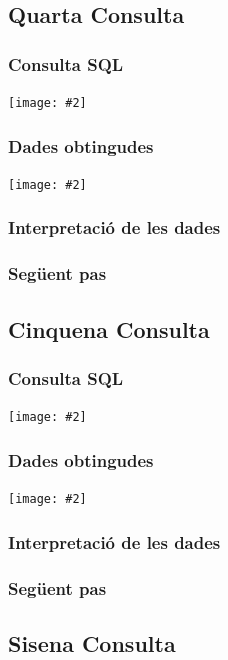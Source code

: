 \documentclass[a4paper,12pt]{article}
\newcommand{\mygraphic}[2][width=\textwidth]{\begin{center}
		\centering\texttt{[image: \#2]}\par
\end{center}}
\begin{document}
\subsection{Quarta Consulta}

\subsubsection{Consulta SQL}
\mygraphic{imatges/7.png}

\subsubsection{Dades obtingudes}
\mygraphic{imatges/8.png}

\subsubsection{Interpretació de les dades}

\subsubsection{Següent pas}

\subsection{Cinquena Consulta}

\subsubsection{Consulta SQL}
\mygraphic{imatges/9.png}

\subsubsection{Dades obtingudes}
\mygraphic{imatges/10.png}

\subsubsection{Interpretació de les dades}

\subsubsection{Següent pas}

\subsection{Sisena Consulta}
\end{document}
